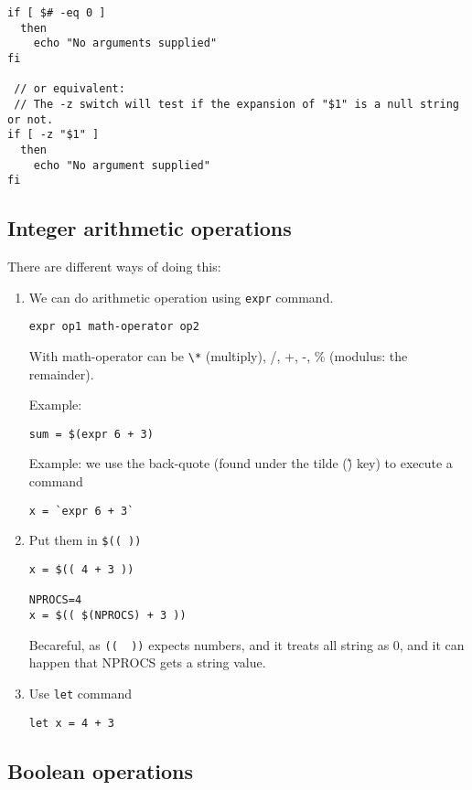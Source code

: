 \begin{verbatim}
if [ $# -eq 0 ]
  then
    echo "No arguments supplied"
fi

 // or equivalent: 
 // The -z switch will test if the expansion of "$1" is a null string or not. 
if [ -z "$1" ]
  then
    echo "No argument supplied"
fi
\end{verbatim}


\subsection{Integer arithmetic operations}

There are different ways of doing this:
\begin{enumerate}
  \item We can do arithmetic operation using \verb!expr! command.

\begin{verbatim}
expr op1 math-operator op2
\end{verbatim}
With math-operator can be \verb!\*! (multiply), /, +, -, \% (modulus: the
remainder).

Example:
\begin{verbatim}
sum = $(expr 6 + 3)
\end{verbatim}

Example: we use the back-quote (found under the tilde (\~) key) to execute a
command
\begin{verbatim}
x = `expr 6 + 3`
\end{verbatim}


   \item Put them in \verb!$(( ))!

\begin{verbatim}
x = $(( 4 + 3 ))

NPROCS=4
x = $(( $(NPROCS) + 3 ))
\end{verbatim}

Becareful, as \verb!((  ))! expects numbers, and it treats all string as 0, and
it can happen that NPROCS gets a string value.

   \item Use \verb!let! command
\begin{verbatim}
let x = 4 + 3
\end{verbatim}
\end{enumerate}


\subsection{Boolean operations}

